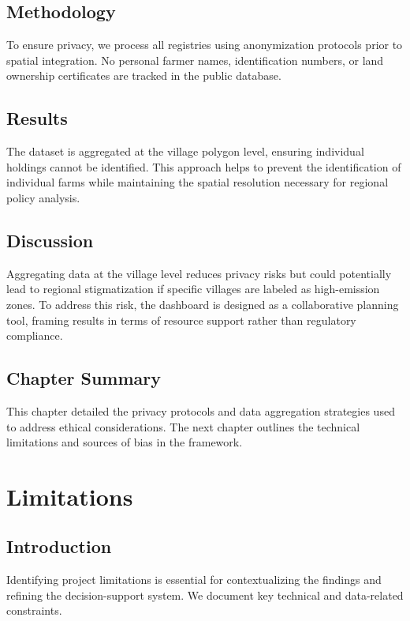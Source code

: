 \documentclass[12pt,a4paper]{report}
\begin{document}
\section{Methodology}
To ensure privacy, we process all registries using anonymization protocols prior to spatial integration. No personal farmer names, identification numbers, or land ownership certificates are tracked in the public database.

\section{Results}
The dataset is aggregated at the village polygon level, ensuring individual holdings cannot be identified. This approach helps to prevent the identification of individual farms while maintaining the spatial resolution necessary for regional policy analysis.

\section{Discussion}
Aggregating data at the village level reduces privacy risks but could potentially lead to regional stigmatization if specific villages are labeled as high-emission zones. To address this risk, the dashboard is designed as a collaborative planning tool, framing results in terms of resource support rather than regulatory compliance.

\section{Chapter Summary}
This chapter detailed the privacy protocols and data aggregation strategies used to address ethical considerations. The next chapter outlines the technical limitations and sources of bias in the framework.

\chapter{Limitations}
\label{ch:limitations}

\section{Introduction}
Identifying project limitations is essential for contextualizing the findings and refining the decision-support system. We document key technical and data-related constraints.
\end{document}
